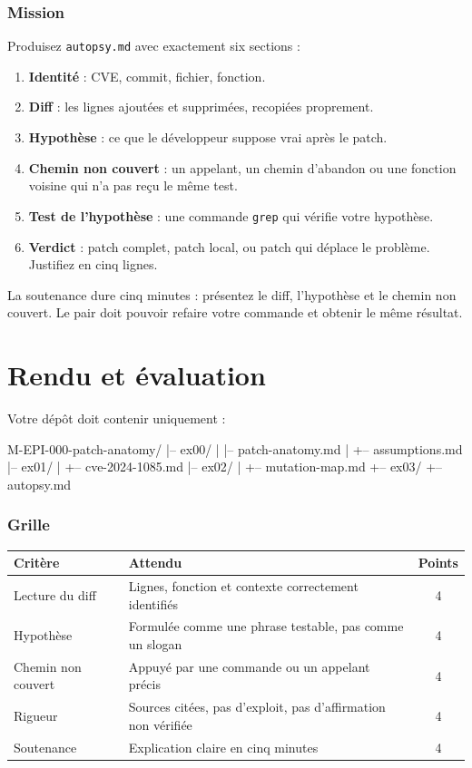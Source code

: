 \documentclass{training}
\begin{document}
\subsection*{Mission}

Produisez \texttt{autopsy.md} avec exactement six sections :

\begin{enumerate}
  \item \textbf{Identité} : CVE, commit, fichier, fonction.
  \item \textbf{Diff} : les lignes ajoutées et supprimées, recopiées
        proprement.
  \item \textbf{Hypothèse} : ce que le développeur suppose vrai après le
        patch.
  \item \textbf{Chemin non couvert} : un appelant, un chemin d'abandon ou une
        fonction voisine qui n'a pas reçu le même test.
  \item \textbf{Test de l'hypothèse} : une commande \texttt{grep} qui
        vérifie votre hypothèse.
  \item \textbf{Verdict} : patch complet, patch local, ou patch qui déplace
        le problème. Justifiez en cinq lignes.
\end{enumerate}

La soutenance dure cinq minutes : présentez le diff, l'hypothèse et le
chemin non couvert. Le pair doit pouvoir refaire votre commande et obtenir
le même résultat.

\chapter{Rendu et évaluation}

Votre dépôt doit contenir uniquement :

\begin{console}
M-EPI-000-patch-anatomy/
|-- ex00/
|   |-- patch-anatomy.md
|   +-- assumptions.md
|-- ex01/
|   +-- cve-2024-1085.md
|-- ex02/
|   +-- mutation-map.md
+-- ex03/
    +-- autopsy.md
\end{console}

\subsection*{Grille}

\begin{center}
\begin{tabularx}{\linewidth}{|l|X|c|}
\hline
\textbf{Critère} & \textbf{Attendu} & \textbf{Points} \\ \hline
Lecture du diff & Lignes, fonction et contexte correctement identifiés & 4 \\ \hline
Hypothèse & Formulée comme une phrase testable, pas comme un slogan & 4 \\ \hline
Chemin non couvert & Appuyé par une commande ou un appelant précis & 4 \\ \hline
Rigueur & Sources citées, pas d'exploit, pas d'affirmation non vérifiée & 4 \\ \hline
Soutenance & Explication claire en cinq minutes & 4 \\ \hline
\end{tabularx}
\end{center}
\end{document}
